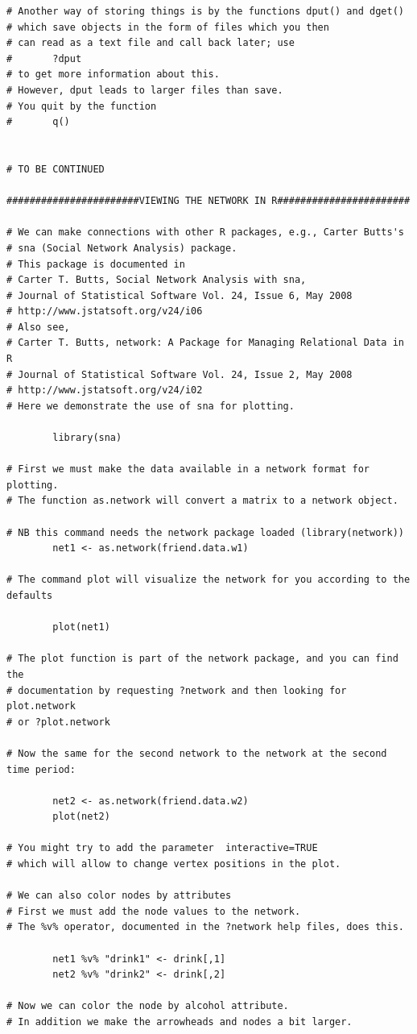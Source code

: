 \documentclass[a4paper,fleqn]{article}
\newcommand{\+}{\, + \,}
\begin{document}
{\begin{verbatim}
# Another way of storing things is by the functions dput() and dget()
# which save objects in the form of files which you then
# can read as a text file and call back later; use
#       ?dput
# to get more information about this.
# However, dput leads to larger files than save.
# You quit by the function
#       q()


# TO BE CONTINUED

#######################VIEWING THE NETWORK IN R#######################

# We can make connections with other R packages, e.g., Carter Butts's
# sna (Social Network Analysis) package.
# This package is documented in
# Carter T. Butts, Social Network Analysis with sna,
# Journal of Statistical Software Vol. 24, Issue 6, May 2008
# http://www.jstatsoft.org/v24/i06
# Also see,
# Carter T. Butts, network: A Package for Managing Relational Data in R
# Journal of Statistical Software Vol. 24, Issue 2, May 2008
# http://www.jstatsoft.org/v24/i02
# Here we demonstrate the use of sna for plotting.

        library(sna)

# First we must make the data available in a network format for plotting.
# The function as.network will convert a matrix to a network object.

# NB this command needs the network package loaded (library(network))
        net1 <- as.network(friend.data.w1)

# The command plot will visualize the network for you according to the defaults

        plot(net1)

# The plot function is part of the network package, and you can find the
# documentation by requesting ?network and then looking for plot.network
# or ?plot.network

# Now the same for the second network to the network at the second time period:

        net2 <- as.network(friend.data.w2)
        plot(net2)

# You might try to add the parameter  interactive=TRUE
# which will allow to change vertex positions in the plot.

# We can also color nodes by attributes
# First we must add the node values to the network.
# The %v% operator, documented in the ?network help files, does this.

        net1 %v% "drink1" <- drink[,1]
        net2 %v% "drink2" <- drink[,2]

# Now we can color the node by alcohol attribute.
# In addition we make the arrowheads and nodes a bit larger.


\end{verbatim}}
\end{document}
